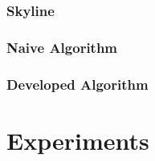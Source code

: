 \documentclass[senior,final,11pt]{iscs-thesis}
\begin{document}
\subsection{Skyline}%

\subsection{Naive Algorithm}%

\subsection{Developed Algorithm}%



\chapter{Experiments}
\end{document}
